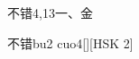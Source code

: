 \begin{entry}{不错}{4,13}{⼀、⾦}
  \begin{phonetics}{不错}{bu2 cuo4}[][HSK 2]
  \end{phonetics}
\end{entry}
